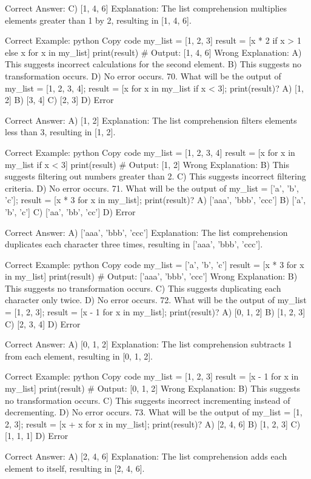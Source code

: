 Correct Answer: C) [1, 4, 6]
Explanation: The list comprehension multiplies elements greater than 1 by 2, resulting in [1, 4, 6].

Correct Example:
python
Copy code
my_list = [1, 2, 3]
result = [x * 2 if x > 1 else x for x in my_list]
print(result)  # Output: [1, 4, 6]
Wrong Explanation:
A) This suggests incorrect calculations for the second element.
B) This suggests no transformation occurs.
D) No error occurs.
70. What will be the output of my_list = [1, 2, 3, 4]; result = [x for x in my_list if x < 3]; print(result)?
A) [1, 2]
B) [3, 4]
C) [2, 3]
D) Error

Correct Answer: A) [1, 2]
Explanation: The list comprehension filters elements less than 3, resulting in [1, 2].

Correct Example:
python
Copy code
my_list = [1, 2, 3, 4]
result = [x for x in my_list if x < 3]
print(result)  # Output: [1, 2]
Wrong Explanation:
B) This suggests filtering out numbers greater than 2.
C) This suggests incorrect filtering criteria.
D) No error occurs.
71. What will be the output of my_list = ['a', 'b', 'c']; result = [x * 3 for x in my_list]; print(result)?
A) ['aaa', 'bbb', 'ccc']
B) ['a', 'b', 'c']
C) ['aa', 'bb', 'cc']
D) Error

Correct Answer: A) ['aaa', 'bbb', 'ccc']
Explanation: The list comprehension duplicates each character three times, resulting in ['aaa', 'bbb', 'ccc'].

Correct Example:
python
Copy code
my_list = ['a', 'b', 'c']
result = [x * 3 for x in my_list]
print(result)  # Output: ['aaa', 'bbb', 'ccc']
Wrong Explanation:
B) This suggests no transformation occurs.
C) This suggests duplicating each character only twice.
D) No error occurs.
72. What will be the output of my_list = [1, 2, 3]; result = [x - 1 for x in my_list]; print(result)?
A) [0, 1, 2]
B) [1, 2, 3]
C) [2, 3, 4]
D) Error

Correct Answer: A) [0, 1, 2]
Explanation: The list comprehension subtracts 1 from each element, resulting in [0, 1, 2].

Correct Example:
python
Copy code
my_list = [1, 2, 3]
result = [x - 1 for x in my_list]
print(result)  # Output: [0, 1, 2]
Wrong Explanation:
B) This suggests no transformation occurs.
C) This suggests incorrect incrementing instead of decrementing.
D) No error occurs.
73. What will be the output of my_list = [1, 2, 3]; result = [x + x for x in my_list]; print(result)?
A) [2, 4, 6]
B) [1, 2, 3]
C) [1, 1, 1]
D) Error

Correct Answer: A) [2, 4, 6]
Explanation: The list comprehension adds each element to itself, resulting in [2, 4, 6].


